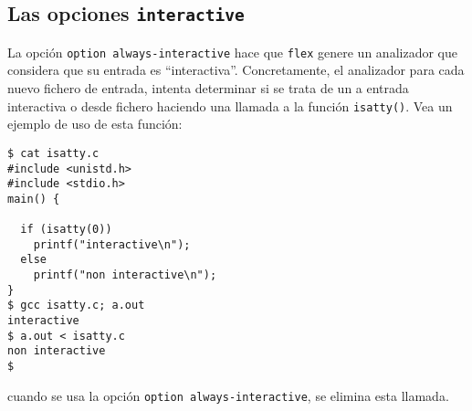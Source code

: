 \subsection{Las opciones {\tt interactive}}
La opción \verb|option always-interactive|  hace que \verb|flex| genere un analizador que considera que su entrada es ``interactiva''. Concretamente, el analizador para cada nuevo fichero de entrada, intenta determinar si se trata de un a entrada interactiva o desde fichero haciendo una llamada a la función \verb|isatty()|.  Vea un ejemplo de uso de esta función:

\begin{verbatim}
$ cat isatty.c
#include <unistd.h>
#include <stdio.h>
main() {
 
  if (isatty(0))
    printf("interactive\n");
  else
    printf("non interactive\n");
}
$ gcc isatty.c; a.out
interactive
$ a.out < isatty.c
non interactive
$                
\end{verbatim}
cuando se usa la opción \verb|option always-interactive|, se elimina esta llamada.


